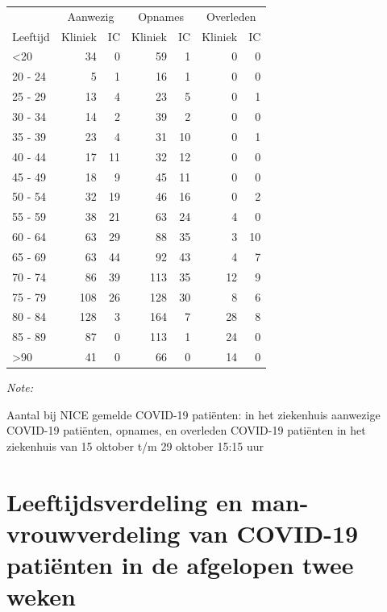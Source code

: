 \documentclass[
  english,
  man,floatsintext]{apa6}
\begin{document}
\begin{table}
\centering\begingroup\fontsize{10}{12}\selectfont

\begin{threeparttable}
\begin{tabular}{lrrrrrr}
\toprule
\multicolumn{1}{c}{ } & \multicolumn{2}{c}{Aanwezig} & \multicolumn{2}{c}{Opnames} & \multicolumn{2}{c}{Overleden} \\
\cmidrule(l{3pt}r{3pt}){2-3} \cmidrule(l{3pt}r{3pt}){4-5} \cmidrule(l{3pt}r{3pt}){6-7}
Leeftijd & Kliniek & IC & Kliniek & IC & Kliniek & IC\\
\midrule
<20 & 34 & 0 & 59 & 1 & 0 & 0\\
20 - 24 & 5 & 1 & 16 & 1 & 0 & 0\\
25 - 29 & 13 & 4 & 23 & 5 & 0 & 1\\
30 - 34 & 14 & 2 & 39 & 2 & 0 & 0\\
35 - 39 & 23 & 4 & 31 & 10 & 0 & 1\\
40 - 44 & 17 & 11 & 32 & 12 & 0 & 0\\
45 - 49 & 18 & 9 & 45 & 11 & 0 & 0\\
50 - 54 & 32 & 19 & 46 & 16 & 0 & 2\\
55 - 59 & 38 & 21 & 63 & 24 & 4 & 0\\
60 - 64 & 63 & 29 & 88 & 35 & 3 & 10\\
65 - 69 & 63 & 44 & 92 & 43 & 4 & 7\\
70 - 74 & 86 & 39 & 113 & 35 & 12 & 9\\
75 - 79 & 108 & 26 & 128 & 30 & 8 & 6\\
80 - 84 & 128 & 3 & 164 & 7 & 28 & 8\\
85 - 89 & 87 & 0 & 113 & 1 & 24 & 0\\
>90 & 41 & 0 & 66 & 0 & 14 & 0\\
\bottomrule
\end{tabular}
\begin{tablenotes}
\item \textit{Note: } 
\item Aantal bij NICE gemelde COVID-19 patiënten: in het ziekenhuis aanwezige COVID-19 patiënten, opnames, en overleden COVID-19 patiënten in het ziekenhuis van 15 oktober t/m 29 oktober 15:15 uur
\end{tablenotes}
\end{threeparttable}
\endgroup{}
\end{table}

\newpage

\hypertarget{leeftijdsverdeling-en-man-vrouwverdeling-van-covid-19-patiuxebnten-in-de-afgelopen-twee-weken}{%
\section{Leeftijdsverdeling en man-vrouwverdeling van COVID-19 patiënten in de afgelopen twee weken}\label{leeftijdsverdeling-en-man-vrouwverdeling-van-covid-19-patiuxebnten-in-de-afgelopen-twee-weken}}
\end{document}
